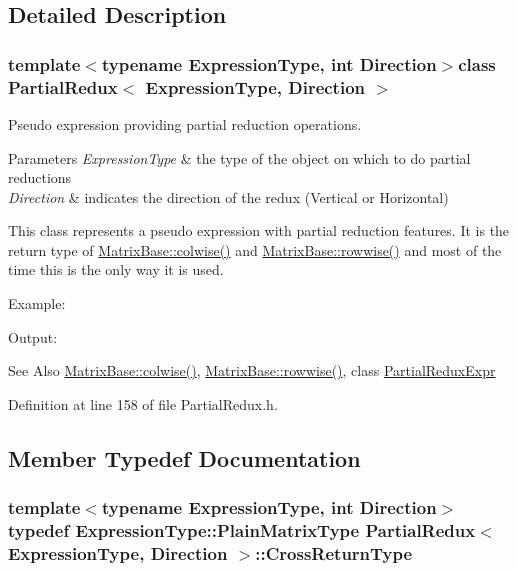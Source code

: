 \subsection{Detailed Description}
\subsubsection*{template$<$typename Expression\-Type, int Direction$>$class Partial\-Redux$<$ Expression\-Type, Direction $>$}

Pseudo expression providing partial reduction operations. 


\begin{DoxyParams}{Parameters}
{\em Expression\-Type} & the type of the object on which to do partial reductions \\
\hline
{\em Direction} & indicates the direction of the redux (Vertical or Horizontal)\\
\hline
\end{DoxyParams}
This class represents a pseudo expression with partial reduction features. It is the return type of \hyperlink{class_matrix_base_aa3b6a7cd048404185023d21eaeac21ba}{Matrix\-Base\-::colwise()} and \hyperlink{class_matrix_base_aebd5699cf5758edecbef6a16c6fed4f1}{Matrix\-Base\-::rowwise()} and most of the time this is the only way it is used.

Example\-:
\begin{DoxyCodeInclude}
\end{DoxyCodeInclude}
 Output\-:
\begin{DoxyVerbInclude}
\end{DoxyVerbInclude}


\begin{DoxySeeAlso}{See Also}
\hyperlink{class_matrix_base_aa3b6a7cd048404185023d21eaeac21ba}{Matrix\-Base\-::colwise()}, \hyperlink{class_matrix_base_aebd5699cf5758edecbef6a16c6fed4f1}{Matrix\-Base\-::rowwise()}, class \hyperlink{class_partial_redux_expr}{Partial\-Redux\-Expr} 
\end{DoxySeeAlso}


Definition at line 158 of file Partial\-Redux.\-h.



\subsection{Member Typedef Documentation}
\hypertarget{class_partial_redux_a37567c70c25e1c7992976f173114fedb}{
\subsubsection[{Cross\-Return\-Type}]{\setlength{\rightskip}{0pt plus 5cm}template$<$typename Expression\-Type, int Direction$>$ typedef Expression\-Type\-::\-Plain\-Matrix\-Type {\bf Partial\-Redux}$<$ Expression\-Type, Direction $>$\-::{\bf Cross\-Return\-Type}}}\label{class_partial_redux_a37567c70c25e1c7992976f173114fedb}


